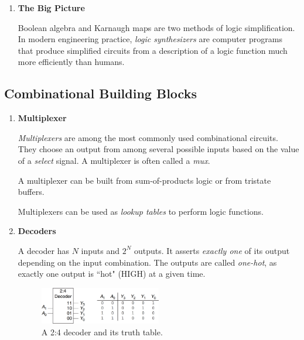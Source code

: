 \documentclass[12pt]{article}
\begin{document}
\begin{enumerate}
  \item \textbf{The Big Picture}

  Boolean algebra and Karnaugh maps are two methods of logic simplification. In modern engineering practice, \textit{logic synthesizers} are computer programs that produce simplified circuits from a description of a logic function much more efficiently than humans.
\end{enumerate}

\subsection{Combinational Building Blocks}

\begin{enumerate}
  \item \textbf{Multiplexer}

  \textit{Multiplexers} are among the most commonly used combinational circuits. They choose an output from among several possible inputs based on the value of a \textit{select} signal. A multiplexer is often called a \textit{mux}.

  A multiplexer can be built from sum-of-products logic or from tristate buffers.

  Multiplexers can be used as \textit{lookup tables} to perform logic functions.

  \item \textbf{Decoders}

  A decoder has $N$ inputs and $2^N$ outputs. It asserts \textit{exactly one} of its output depending on the input combination. The outputs are called \textit{one-hot}, as exactly one output is ``hot" (HIGH) at a given time.

  \begin{figure}[ht]
    \centering
    \includegraphics[width=0.5\textwidth]{decoder.png}
    \caption{A 2:4 decoder and its truth table.}
    \label{figure:7}
  \end{figure}
\end{enumerate}
\end{document}
